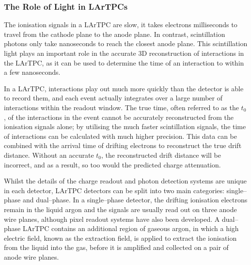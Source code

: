 \subsubsection*{The Role of Light in LArTPCs}

The ionisation signals in a LArTPC are slow, it takes electrons milliseconds to
travel from the cathode plane to the anode plane. In contrast, scintillation 
photons only take nanoseconds to reach the closest anode plane. This 
scintillation light plays an important role in the accurate 3D reconstruction 
of interactions in the LArTPC, as it can be used to determine the time of an 
interaction to within a few nanoseconds.

In a LArTPC, interactions play out much more quickly than the detector is able 
to record them, and each event actually integrates over a large number of 
interactions within the readout window. The true time, often referred to as 
the $t_0$, of the interactions in the event cannot be accurately reconstructed 
from the ionisation signals alone; by utilising the much faster scintillation 
signals, the time of interactions can be calculated with much higher 
precision. This data can be combined with the arrival time of drifting 
electrons to reconstruct the true drift distance. Without an accurate $t_0$, 
the reconstructed drift distance will be incorrect, and as a result, so too
would the predicted charge attenuation.

Whilst the details of the charge readout and photon detection systems are unique
in each detector, LArTPC detectors can be split into two main categories: 
single--phase and dual--phase. In a single--phase detector, the drifting 
ionisation electrons remain in the liquid argon and the signals are usually 
read out on three anode wire planes, although pixel readout systems have also 
been developed\cite{argoncube}. A dual--phase LArTPC contains an additional 
region of gaseous argon, in which a high electric field, known as the 
extraction field, is applied to extract the ionisation from the liquid into 
the gas, before it is amplified and collected on a pair of anode wire 
planes\cite{Abi:2020wmh}.

